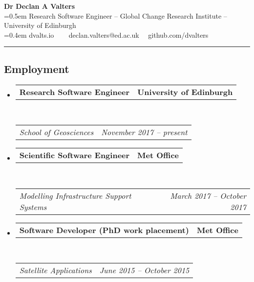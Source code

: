 \documentclass[10.5pt,a4]{article}
\makeatletter
\newcommand{\headerrow}[2]
{\begin{tabular*}{\linewidth}{l@{\extracolsep{\fill}}r}
	#1 &
	#2 \\
\end{tabular*}}
\makeatother
\begin{document}
\begin{center}
{\LARGE \textbf{Dr Declan A Valters}} \\
\parskip=0.5em
{Research Software Engineer -- Global Change Research Institute -- University of Edinburgh} \\
\parskip=0.4em
dvalts.io  \ \textbullet
\ \ declan.valters@ed.ac.uk \ \textbullet \ github.com/dvalters
\end{center}



\hrule
\vspace{-0.4em}


\subsection*{Employment}
\begin{itemize}
	\parskip=0.1em

	\item
	\headerrow
		{\textbf{Research Software Engineer}}
		{\textbf{University of Edinburgh}}
	\\
	\headerrow
		{\emph{School of Geosciences}}
		{\emph{November 2017 -- present}}

	\item
	\headerrow
		{\textbf{Scientific Software Engineer}}
		{\textbf{Met Office}}
	\\
	\headerrow
		{\emph{Modelling Infrastructure Support Systems}}
		{\emph{March 2017 -- October 2017}}

	\item
	\headerrow
		{\textbf{Software Developer (PhD work placement)}}
		{\textbf{Met Office}}
	\\
	\headerrow
		{\emph{Satellite Applications}}
		{\emph{June 2015 -- October 2015}}

\end{itemize}
\end{document}
